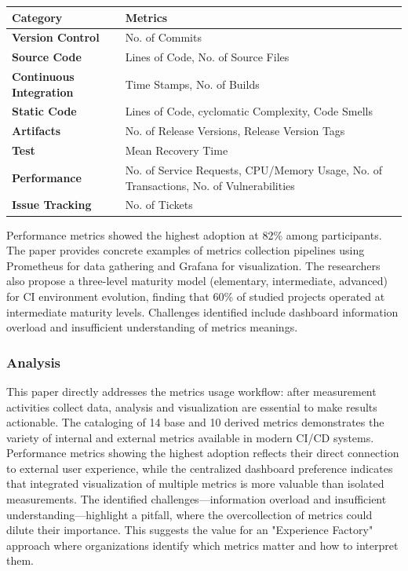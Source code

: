 \documentclass[12pt]{article}
\begin{document}
\begin{center}
	\begin{tabularx}{\textwidth}{|X|X|}
		\hline
		Category                        & Metrics \\
		\hline
		\textbf{Version Control}        & No. of Commits                                                                         \\
		\textbf{Source Code}            & Lines of Code, No. of Source Files                                                     \\
		\textbf{Continuous Integration} & Time Stamps, No. of Builds                                                             \\
		\textbf{Static Code}            & Lines of Code, cyclomatic Complexity, Code Smells                                      \\
		\textbf{Artifacts}              & No. of Release Versions, Release Version Tags                                          \\
		\textbf{Test}                   & Mean Recovery Time                                                                     \\
		\textbf{Performance}            & No. of Service Requests, CPU/Memory Usage, No. of Transactions, No. of Vulnerabilities \\
		\textbf{Issue Tracking}         & No. of Tickets                                                                         \\
		\hline
	\end{tabularx}
\end{center}

Performance metrics showed
the highest adoption at 82\% among participants. The paper provides
concrete examples of metrics collection pipelines using Prometheus
for data gathering and Grafana for visualization. The researchers
also propose a three-level maturity model (elementary, intermediate,
advanced) for CI environment evolution, finding that 60\% of studied
projects operated at intermediate maturity levels. Challenges
identified include dashboard information overload and insufficient
understanding of metrics meanings.

\subsubsection{Analysis}
This paper directly addresses the metrics usage
workflow: after measurement activities collect data, analysis and
visualization are essential to make results actionable. The
cataloging of 14 base and 10 derived metrics demonstrates the variety of
internal and external metrics available in modern CI/CD systems. Performance
metrics showing the highest adoption reflects their direct
connection to external user experience, while the centralized
dashboard preference indicates that integrated visualization of
multiple metrics is more valuable than isolated measurements. The
identified challenges—information overload and insufficient
understanding—highlight a pitfall, where the overcollection of metrics could
dilute their importance. This suggests the value for an "Experience Factory"
approach where organizations identify which metrics matter and how to
interpret them.
\end{document}
